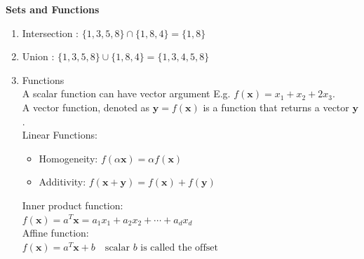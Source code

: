 \documentclass{article}
\newcommand{\matr}[1]{\mathbf{#1}}
\begin{document}
\textbf{Sets and Functions}
\begin{enumerate}
    \item Intersection : $\{1,3,5,8\}\cap\{1,8,4\} = \{1,8\}$
    \item Union : $\{1,3,5,8\} \cup \{1,8,4\} = \{1,3,4,5,8\}$
    \item Functions \\
    A scalar function can have vector argument E.g. $f(\matr{x}) = x_1+x_2+2x_3$. \\
    A vector function, denoted as $\matr{y} = f(\matr{x})$ is a function that returns a vector $\matr{y}$. \\
    Linear Functions: 
    \begin{itemize}
        \item Homogeneity: $f(\alpha \matr{x}) = \alpha f(\matr{x})$
        \item Additivity: $f(\matr{x}+\matr{y}) = f(\matr{x})+f(\matr{y})$
    \end{itemize}
    Inner product function: \\
    $f(\matr{x}) = a^T \matr{x} = a_1 x_1 + a_2 x_2 + \cdots + a_d x_d$ \\
    Affine function: \\
    $f(\matr{x}) = a^T\matr{x}+b \quad \text{scalar $b$ is called the offset}$
\end{enumerate}
\end{document}

